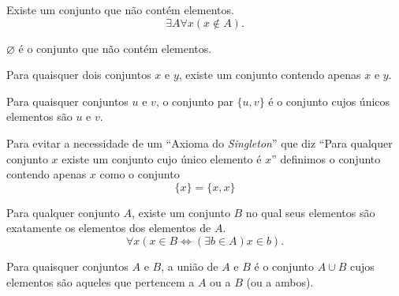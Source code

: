 \begin{axioma}
    \label{ax:vazio}
    Existe um conjunto que não contém elementos.
    \[
        \exists A \forall x (x \notin A).
    \]
\end{axioma}

\begin{definicao}
    \label{def:vazio}
    \(\varnothing\) é o conjunto que não contém elementos.
\end{definicao}

\begin{axioma}
    \label{ax:par}
    Para quaisquer dois conjuntos \(x\) e \(y\), existe um conjunto contendo apenas \(x\) e \(y\).

\end{axioma}

\begin{definicao}
    \label{def:conjunto_par}
    Para quaisquer conjuntos \(u\) e \(v\), o conjunto par \(\{u,v\}\) é o conjunto cujos únicos elementos são \(u\) e \(v\).
\end{definicao}

\begin{definicao}
    \label{def:singleton}
    Para evitar a necessidade de um ``Axioma do \emph{Singleton}'' que diz ``Para qualquer conjunto \(x\) existe um conjunto cujo único elemento é \(x\)''  definimos o conjunto contendo apenas \(x\) como o conjunto
    \[
        \{x\} = \{x,x\}
    \]
\end{definicao}

\begin{axioma}
    \label{ax:uniao}
    Para qualquer conjunto \(A\), existe um conjunto \(B\) no qual seus elementos são exatamente os elementos dos elementos de \(A\).
    \[
        \forall x \left(x \in B \iff (\exists b \in A) x \in b \right).
    \]
\end{axioma}

\begin{definicao}
    \label{def:uniao_finita}
    Para quaisquer conjuntos \(A\) e \(B\), a união de \(A\) e \(B\) é o conjunto \(A \cup B\) cujos elementos são aqueles que pertencem a \(A\) ou a \(B\) (ou a ambos).
\end{definicao}

